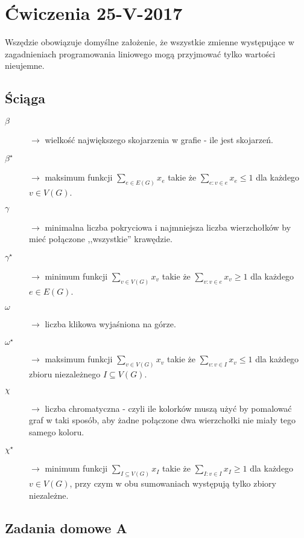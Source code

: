 \section{Ćwiczenia 25-V-2017}

Wszędzie obowiązuje domyślne założenie, że wszystkie zmienne występujące w zagadnieniach programowania liniowego mogą przyjmować tylko wartości nieujemne.
\subsection{Ściąga}
\begin{description}
\item[$\beta $] $\rightarrow$ wielkość największego skojarzenia w grafie - ile jest skojarzeń.
\item[$\beta ^\star$] $\rightarrow$ maksimum funkcji $\sum _{e\in E(G)} x_e$ takie że $\sum _{e:v\in e} x_e\leq 1$ dla każdego $v \in V (G)$.
\item[$\gamma $] $\rightarrow$ minimalna liczba pokryciowa i najmniejsza liczba wierzchołków by mieć połączone ,,wszystkie'' krawędzie.
\item[$\gamma ^\star$] $\rightarrow$ minimum funkcji $\sum _{v\in V(G)} x_v$ takie że $\sum _{v:v\in e} x_v \geq 1$ dla każdego $e \in E(G)$.
\item[$\omega $] $\rightarrow$ liczba klikowa wyjaśniona na górze. 
\item[$\omega ^\star$] $\rightarrow$ maksimum funkcji $\sum _{v\in V(G)} x_v$ takie że $\sum _{v:v\in I} x_v \leq 1$ dla każdego zbioru niezależnego $I \subseteq V(G)$.
\item[$\chi $] $\rightarrow$ liczba chromatyczna - czyli ile kolorków muszą użyć by pomalować graf w taki sposób, aby żadne połączone dwa wierzchołki nie miały tego samego koloru.
\item[$\chi ^\star$] $\rightarrow$ minimum funkcji $\sum _{I\subseteq V(G)} x_I$ takie że $\sum _{I:v\in I} x_I \geq 1$ dla każdego $v \in V(G)$, przy czym w obu sumowaniach występują tylko zbiory niezależne. 
\end{description}

\subsection{Zadania domowe A}
